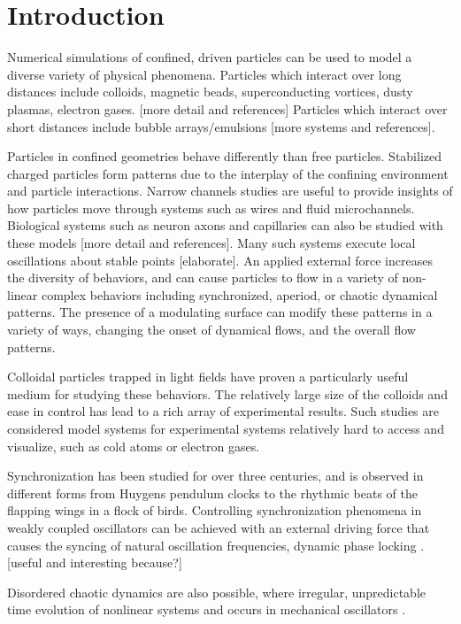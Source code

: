 \documentclass[prb,preprint]{revtex4}
\begin{document}
\section{Introduction} %
%

Numerical simulations of confined, driven particles
can be used to model a diverse variety of physical phenomena.
Particles which interact over long distances
include colloids, magnetic beads, superconducting vortices, dusty plasmas, electron gases. [more detail and references]
Particles which interact over short distances include
bubble arrays/emulsions [more systems and references].

Particles in confined geometries behave differently than free particles.
Stabilized charged particles form patterns
due to the interplay of the confining environment
and particle interactions.
Narrow channels studies are useful to provide insights 
of how particles move through systems 
such as wires and fluid microchannels.
Biological systems such as
neuron axons and capillaries can also be studied
with these models [more detail and references].
Many such systems execute local oscillations
about stable points [elaborate].
%
An applied external force
increases the diversity of behaviors,
and can cause particles to flow in
a variety of non-linear complex behaviors
including
synchronized, aperiod, or chaotic dynamical patterns.
%
The presence of a modulating surface
can modify these patterns in a variety of ways,
changing the onset of dynamical flows,
and the overall flow patterns.

Colloidal particles trapped in light fields have proven
a particularly useful medium for studying these behaviors.%
The relatively large size of the colloids
and ease in control has lead to a rich array of 
experimental results. %
Such studies are considered model systems
for experimental systems relatively hard to access and visualize,
such as cold atoms or electron gases. %


Synchronization has been studied for over three centuries,
and is observed in different forms
from Huygens pendulum clocks
to the rhythmic beats of the flapping wings in a flock of birds.
Controlling
synchronization phenomena in weakly coupled oscillators
can be achieved with an external driving force
that causes the syncing of natural oscillation frequencies,
dynamic phase locking \cite{juniper2015}.
[useful and interesting because?]

Disordered chaotic dynamics are also possible,
where irregular, unpredictable time evolution of
nonlinear systems and occurs in mechanical oscillators \cite{chaos}.
\end{document}
